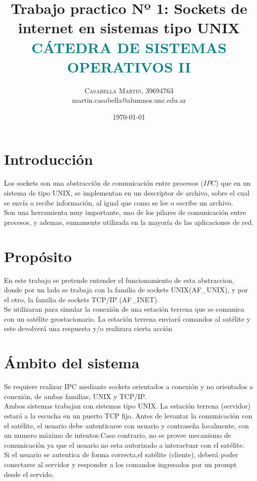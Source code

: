 \documentclass[fontsize=12pt]{article}
\title{\bigskip \bigskip \bigskip \bigskip \vspace{-15mm}\fontsize{35pt}{35pt}\selectfont\textbf{{Trabajo practico Nº 1: Sockets de internet en sistemas tipo UNIX \\}}
\bigskip \bigskip \fontsize{18pt}{10pt}\selectfont\textbf{\textcolor{teal}{CÁTEDRA DE SISTEMAS OPERATIVOS II}}\bigskip\bigskip \bigskip\bigskip \bigskip}\bigskip\bigskip \bigskip\bigskip \bigskip %
\author{
\large
{
\textsc{Casabella Martin, 39694763 }}\\[2mm]
  martin.casabella@alumnos.unc.edu.ar\\[2mm]
\bigskip\bigskip \bigskip \bigskip\bigskip \bigskip
}
\date{\Huge\today}
\begin{document}
\maketitle %
\thispagestyle{fancy} %

\bigskip
\bigskip
\bigskip
\clearpage

\section{\textbf{Introducción}}
Los sockets son una abstracción de comunicación entre procesos ($IPC$) que en un sistema de tipo UNIX,
se implementan en un descriptor de archivo, sobre el cual se envía o recibe información, al igual que como
se lee o escribe un archivo.\\

Son una herramienta muy importante, uno de los pilares de comunicación entre procesos, y ademas, sumamente utilizada
en la mayoría de las aplicaciones de red.

\section{\textbf{Propósito}}
En este trabajo se pretende entender el funcionamiento de esta abstraccion, donde por un lado se trabaja con la familia de 
sockets UNIX(AF\_UNIX), y por el otro, la familia de sockets TCP/IP (AF\_INET).\\

Se utilizaran para simular la conexión de una estación terrena que se comunica con un 
satélite geostacionario. La estación terrena enviará comandos al satélite y este devolverá
una respuesta y/o realizara cierta acción 


\section{\textbf{Ámbito del sistema}}
Se requiere realizar IPC mediante sockets orientados a conexión y no
orientados a conexión, de ambas familias, UNIX y TCP/IP.\\

Ambos sistemas trabajan con sistemas tipo UNIX. La estación terrena (servidor) estará a la escucha en un
puerto TCP fijo. Antes de levantar la comunicación con el satélite, el usuario debe autenticarse con usuario y contraseña localmente, con
un numero máximo de intentos.Caso contrario, no se provee mecanismo de comunicación ya que el usuario no esta autorizado a interactuar con el satélite.\\
Si el usuario se autentica de forma correcta,el satélite (cliente), deberá poder conectarse al servidor y responder a los comandos ingresados por un prompt desde el
servido.\\
\end{document}
